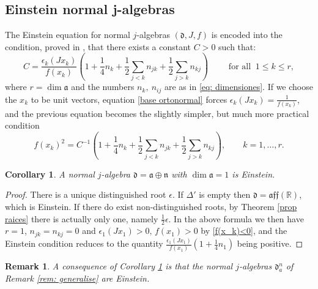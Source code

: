 \documentclass[12pt, twoside]{amsart}
\def\d{\mathfrak{d}}
\def\n{\mathfrak{n}}
\def\a{\mathfrak{a}}
\def\R{\mathbb{R}}
\def\aff{\mathfrak{aff}}
\newtheorem{coro}[definition]{Corollary}
\newtheorem{rem}[definition]{Remark}
\theoremstyle{definition}
\begin{document}
\vspace{.5cm}

\subsection{Einstein normal j-algebras}

The Einstein equation for normal $j$-algebras $(\d, J, f)$ is encoded into the condition, proved in \cite[Section 1]{Dotti}, that there exists a constant $C>0$ such that: 
$$
    C=\frac{\epsilon_{k}(Jx_k)}{f(x_k)}\left(1+\frac{1}{4}n_{k}+\frac{1}{2}\sum_{j<k}n_{jk}+\frac{1}{2}\sum_{j>k}n_{kj}\right)\qquad      \text{ for all }\ 1\leq k \leq r,
$$
 where $r=\dim\a$ and the numbers $n_{k},\ n_{ij}$ are as in  \eqref{eq: dimensiones}. If we choose the  $x_k$ to be unit vectors, equation \eqref{base ortonormal} forces $\epsilon_{k}(Jx_k)=\frac{1}{f(x_k)}$, and the previous equation becomes the slightly simpler, but much more practical condition
\begin{equation}\label{einstein en base ortonormal}
    f(x_k)^{2}=C^{-1} \left(1+\frac{1}{4}n_{k}+\frac{1}{2}\sum_{j<k}n_{jk}+\frac{1}{2}\sum_{j>k}n_{kj}\right), \qquad k=1,\ldots,  r.
\end{equation}

\smallskip

\begin{coro} \label{normal siempre einstein} 
A normal $j$-algebra $\d=\a\oplus\n$ with $\dim \a=1$ is Einstein.
\end{coro}

\begin{proof}
There is a unique distinguished root  $\epsilon$. If $\Delta'$ is empty  then $\d=\aff(\R)$, which is Einstein. 
If there do exist non-distinguished roots, by Theorem \ref{prop raices} there is actually only one, namely $\tfrac{1}{2}\epsilon$. In the above formula 
we then have  $r=1$, $n_{jk}=n_{kj}=0$ and $\epsilon_1(Jx_1)>0, \, f(x_1)>0$ by \eqref{f(x_k)<0}, and the Einstein condition reduces to the quantity $\frac{\epsilon_{1}(Jx_1)}{f(x_1)}(1+\frac{1}{4}n_1)$ being positive.
\end{proof}

\smallskip

\begin{rem}\label{rem: einstein dim=1}
{\rm 
A consequence of Corollary \ref{normal siempre einstein} is that the normal $j$-algebras $\d_a^n$ of Remark \ref{rem: generalise} are Einstein.}
\end{rem}
\medbreak
\end{document}
